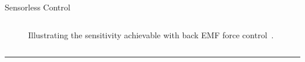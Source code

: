 \begin{frame}{Sensorless Control}
\begin{columns}[t]
\begin{column}{0.28\textwidth}
\begin{figure}
\vspace{-0.75em}
\caption{\scriptsize Illustrating the sensitivity achievable with back EMF force 
control~\cite{kerdels2008b}.}
\end{figure}
\end{column}
\end{columns}	





\begin{center}
\rule{2cm}{0.4pt}\\[0.5em]
\end{center}


\end{frame}
